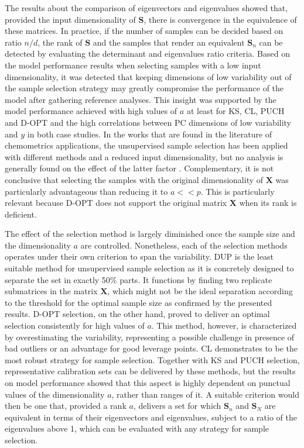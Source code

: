 \documentclass[journal=ancham,manuscript=article]{achemso}
\begin{document}
The results about the comparison of eigenvectors and eigenvalues showed that, provided the input dimensionality of $\mathbf{S}$, there is convergence in the equivalence of these matrices. In practice, if the number of samples can be decided based on ratio $n/d$, the rank of $\mathbf{S}$ and the samples that render an equivalent $\mathbf{S}_n$ can be detected by evaluating the determinant and eigenvalues ratio criteria. Based on the model performance results when selecting samples with a low input dimensionality, it was detected that keeping dimensions of low variability out of the sample selection strategy may greatly compromise the performance of the model after gathering reference analyses. This insight was supported by the model performance achieved with high values of $a$ at least for KS, CL, PUCH and D-OPT and the high correlations between PC dimensions of low variability and $y$ in both case studies. In the works that are found in the literature of chemometrics applications, the unsupervised sample selection has been applied with different methods and a reduced input dimensionality, but no analysis is generally found on the effect of the latter factor \cite{Naes1990, Brandmaier2012, Nawar2018, Au2020}. Complementary, it is not conclusive that selecting the samples with the original dimensionality of $\mathbf{X}$ was particularly advantageous than reducing it to $a<<p$. This is particularly relevant because D-OPT does not support the original matrix $\mathbf{X}$ when its rank is deficient.

The effect of the selection method is largely diminished once the sample size and the dimensionality $a$ are controlled. Nonetheless, each of the selection methods operates under their own criterion to span the variability. DUP is the least suitable method for unsupervised sample selection as it is concretely designed to separate the set in exactly 50\% parts. It functions by finding two replicate submatrices in the matrix $\mathbf{X}$, which might not be the ideal separation according to the threshold for the optimal sample size as confirmed by the presented results. D-OPT selection, on the other hand, proved to deliver an optimal selection consistently for high values of $a$. This method, however, is characterized by overestimating the variability, representing a possible challenge in presence of bad outliers or an advantage for good leverage points. CL demonstrates to be the most robust strategy for sample selection. Together with KS and PUCH selection, representative calibration sets can be delivered by these methods, but the results on model performance showed that this aspect is highly dependent on punctual values of the dimensionality $a$, rather than ranges of it. A suitable criterion would then be one that, provided a rank $a$, delivers a set for which $\mathbf{S}_n$ and $\mathbf{S}_N$ are equivalent in terms of their eigenvectors and eigenvalues, subject to a ratio of the eigenvalues above 1, which can be evaluated with any strategy for sample selection. 
\end{document}
